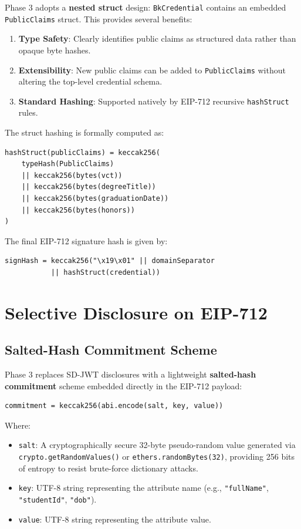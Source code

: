 Phase 3 adopts a \textbf{nested struct} design: \texttt{BkCredential} contains an embedded \texttt{PublicClaims} struct. This provides several benefits:

\begin{enumerate}
    \item \textbf{Type Safety}: Clearly identifies public claims as structured data rather than opaque byte hashes.
    \item \textbf{Extensibility}: New public claims can be added to \texttt{PublicClaims} without altering the top-level credential schema.
    \item \textbf{Standard Hashing}: Supported natively by EIP-712 recursive \texttt{hashStruct} rules.
\end{enumerate}

The struct hashing is formally computed as:

\begin{lstlisting}
hashStruct(publicClaims) = keccak256(
    typeHash(PublicClaims)
    || keccak256(bytes(vct))
    || keccak256(bytes(degreeTitle))
    || keccak256(bytes(graduationDate))
    || keccak256(bytes(honors))
)
\end{lstlisting}

The final EIP-712 signature hash is given by:

\begin{lstlisting}
signHash = keccak256("\x19\x01" || domainSeparator 
           || hashStruct(credential))
\end{lstlisting}

\section{Selective Disclosure on EIP-712}

\subsection{Salted-Hash Commitment Scheme}

Phase 3 replaces SD-JWT disclosures with a lightweight \textbf{salted-hash commitment} scheme embedded directly in the EIP-712 payload:

\begin{lstlisting}
commitment = keccak256(abi.encode(salt, key, value))
\end{lstlisting}

Where:
\begin{itemize}
    \item \texttt{salt}: A cryptographically secure 32-byte pseudo-random value generated via \texttt{crypto.getRandomValues()} or \texttt{ethers.randomBytes(32)}, providing 256 bits of entropy to resist brute-force dictionary attacks.
    \item \texttt{key}: UTF-8 string representing the attribute name (e.g., \texttt{"fullName"}, \texttt{"studentId"}, \texttt{"dob"}).
    \item \texttt{value}: UTF-8 string representing the attribute value.
\end{itemize}

